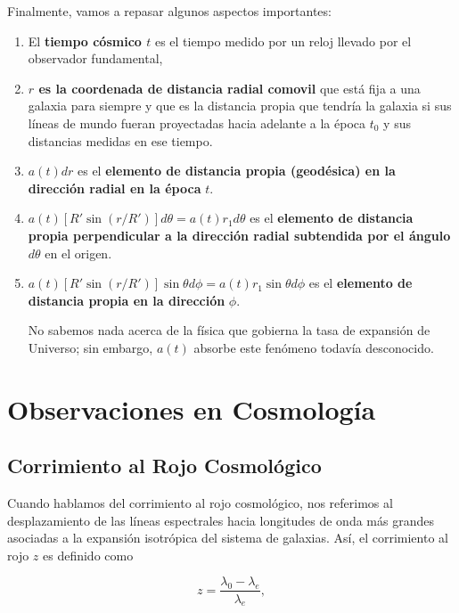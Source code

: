 \documentclass[11pt]{article}
\begin{document}
Finalmente, vamos a repasar algunos aspectos importantes:

    \begin{enumerate}

        \item El {\bf{tiempo cósmico $t$}} es el tiempo medido por un reloj llevado por el observador fundamental,
        \item {\bf{$r$ es la coordenada de distancia radial comovil}} que está fija a una galaxia para siempre y que es la distancia propia que tendría la galaxia si sus líneas de mundo fueran proyectadas hacia adelante a la época $t_0$ y sus distancias medidas en ese tiempo. 
        \item $a(t)dr$ es el {\bf{elemento de distancia propia (geodésica) en la dirección radial en la época}} $t$. 
        \item $a(t) [R'\sin(r/R')] d\theta = a(t) r_1 d\theta$ es el {\bf{elemento de distancia propia perpendicular a la dirección radial subtendida por el ángulo}} $d\theta$ en el origen. 
        \item $a(t) [R'\sin(r/R')] \sin \theta d\phi = a(t) r_1 \sin \theta d\phi$ es el {\bf{elemento de distancia propia en la dirección}} $\phi$.
        
        No sabemos nada acerca de la física que gobierna la tasa de expansión de Universo; sin embargo, $a(t)$ absorbe este fenómeno todavía desconocido.  
        
    \end{enumerate} 



\section{Observaciones en Cosmología}

\subsection{Corrimiento al Rojo Cosmológico}

Cuando hablamos del corrimiento al rojo cosmológico, nos referimos al desplazamiento de las líneas espectrales hacia longitudes de onda más grandes asociadas a la expansión isotrópica del sistema de galaxias. Así, el corrimiento al rojo $z$ es definido como

\begin{equation}
    z = \frac{\lambda_0 - \lambda_e}{\lambda_e},
\end{equation}
\end{document}
